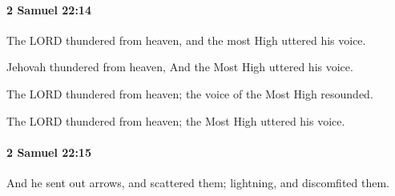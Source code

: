 		\paragraph{2 Samuel 22:14} %
			\label{2SAMUEL-22-14}

			The LORD thundered from heaven, and the most High uttered his voice.

			\begin{versebox}
					\item[BHS] 
					\item[ASV] Jehovah thundered from heaven, And the Most High uttered his voice.
					\item[NIV] The LORD thundered from heaven; the voice of the Most High resounded.
					\item[NRSV] The LORD thundered from heaven; the Most High uttered his voice.
			\end{versebox}

		\paragraph{2 Samuel 22:15} %
			\label{2SAMUEL-22-15}

			And he sent out arrows, and scattered them; lightning, and discomfited them.


